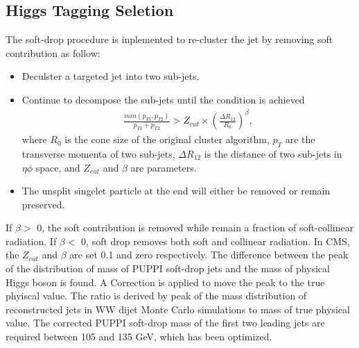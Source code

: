 \subsection{Higgs Tagging Seletion} 

The soft-drop procedure is inplemented to re-cluster the jet by removing soft contribution as follow:
\begin{itemize}
\item Deculster a targeted jet into two sub-jets.
\item Continue to decompose the sub-jets until the condition is achieved
\begin{equation} \label{eq5}
\begin{split}
\frac{min(p_{T1},p_{T2})}{p_{T1}+p_{T2}} > Z_{cut} \times (\frac{\Delta R_{12}}{R_0})^{\beta}, 
\end{split}
\end{equation}
where $R_0$ is the cone size of the original cluster algorithm, $p_T$ are the transverse momenta of two sub-jets, $\Delta R_{12}$ is the distance of two sub-jets in $\eta \phi$ space, and $Z_{cut}$ and $\beta $ are parameters. 
\item The unsplit singelet particle at the end will either be removed or remain preserved.
\end{itemize} 
If $\beta  >$ 0, the soft contribution is removed while remain a fraction of soft-collinear radiation. 
If $\beta  <$ 0, soft drop removes both soft and collinear radiation.
In CMS, the $Z_{cut}$ and $\beta $ are set 0.1 and zero respectively.
The difference between the peak of the distribution of mass of PUPPI soft-drop jets and the mass of physical Higgs boson is found.
A Correction is applied to move the peak to the true phyiscal value. 
The ratio is derived by peak of the mass distribution of reconstructed jets in WW dijet Monte Carlo simulations to mass of true physical value.
The corrected PUPPI soft-drop mass of the first two leading jets are required between 105 and 135 GeV, which has been optimized.
 
